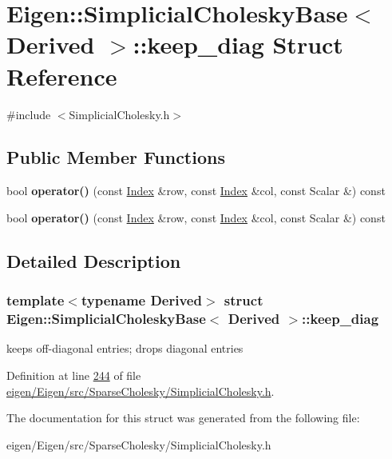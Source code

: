 \hypertarget{struct_eigen_1_1_simplicial_cholesky_base_1_1keep__diag}{}\section{Eigen\+:\+:Simplicial\+Cholesky\+Base$<$ Derived $>$\+:\+:keep\+\_\+diag Struct Reference}
\label{struct_eigen_1_1_simplicial_cholesky_base_1_1keep__diag}


{\ttfamily \#include $<$Simplicial\+Cholesky.\+h$>$}

\subsection*{Public Member Functions}
\begin{DoxyCompactItemize}
\item 
\mbox{\label{struct_eigen_1_1_simplicial_cholesky_base_1_1keep__diag_a3dfd9db46337c3497307c3940289c771}} 
bool {\bfseries operator()} (const \hyperlink{namespace_eigen_a62e77e0933482dafde8fe197d9a2cfde}{Index} \&row, const \hyperlink{namespace_eigen_a62e77e0933482dafde8fe197d9a2cfde}{Index} \&col, const Scalar \&) const
\item 
\mbox{\label{struct_eigen_1_1_simplicial_cholesky_base_1_1keep__diag_a3dfd9db46337c3497307c3940289c771}} 
bool {\bfseries operator()} (const \hyperlink{namespace_eigen_a62e77e0933482dafde8fe197d9a2cfde}{Index} \&row, const \hyperlink{namespace_eigen_a62e77e0933482dafde8fe197d9a2cfde}{Index} \&col, const Scalar \&) const
\end{DoxyCompactItemize}


\subsection{Detailed Description}
\subsubsection*{template$<$typename Derived$>$\newline
struct Eigen\+::\+Simplicial\+Cholesky\+Base$<$ Derived $>$\+::keep\+\_\+diag}

keeps off-\/diagonal entries; drops diagonal entries 

Definition at line \hyperlink{eigen_2_eigen_2src_2_sparse_cholesky_2_simplicial_cholesky_8h_source_l00244}{244} of file \hyperlink{eigen_2_eigen_2src_2_sparse_cholesky_2_simplicial_cholesky_8h_source}{eigen/\+Eigen/src/\+Sparse\+Cholesky/\+Simplicial\+Cholesky.\+h}.



The documentation for this struct was generated from the following file\+:\begin{DoxyCompactItemize}
\item 
eigen/\+Eigen/src/\+Sparse\+Cholesky/\+Simplicial\+Cholesky.\+h\end{DoxyCompactItemize}
